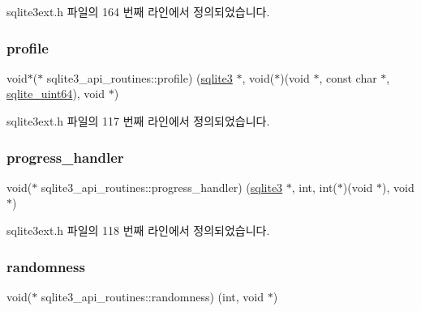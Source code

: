 sqlite3ext.\+h 파일의 164 번째 라인에서 정의되었습니다.

\mbox{\label{structsqlite3__api__routines_afa3554d38034ec4c0a339e2e908732db}} 
\subsubsection{\texorpdfstring{profile}{profile}}
{\footnotesize\ttfamily void$\ast$($\ast$ sqlite3\+\_\+api\+\_\+routines\+::profile) (\hyperlink{sqlite3_8h_a0ef6f2646262c8a9b24368d8ac140f69}{sqlite3} $\ast$, void($\ast$)(void $\ast$, const char $\ast$, \hyperlink{sqlite3_8h_a127a9c18f6d067a05b994f5d0111ee25}{sqlite\+\_\+uint64}), void $\ast$)}



sqlite3ext.\+h 파일의 117 번째 라인에서 정의되었습니다.

\mbox{\label{structsqlite3__api__routines_a58d79a7091ade0d1630d62ecf1931e9d}} 
\subsubsection{\texorpdfstring{progress\+\_\+handler}{progress\_handler}}
{\footnotesize\ttfamily void($\ast$ sqlite3\+\_\+api\+\_\+routines\+::progress\+\_\+handler) (\hyperlink{sqlite3_8h_a0ef6f2646262c8a9b24368d8ac140f69}{sqlite3} $\ast$, int, int($\ast$)(void $\ast$), void $\ast$)}



sqlite3ext.\+h 파일의 118 번째 라인에서 정의되었습니다.

\mbox{\label{structsqlite3__api__routines_addef940dbc8b1d1c1356f3e4ee494540}} 
\subsubsection{\texorpdfstring{randomness}{randomness}}
{\footnotesize\ttfamily void($\ast$ sqlite3\+\_\+api\+\_\+routines\+::randomness) (int, void $\ast$)}



